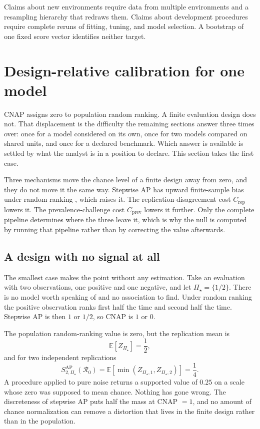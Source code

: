\documentclass[11pt]{article}
\newcommand{\Regime}{\mathcal{R}}
\newcommand{\PSet}{\Pi_\star}
\newcommand{\E}{\mathbb{E}}
\theoremstyle{remark}
\begin{document}
Claims about new environments require data from multiple environments and a resampling hierarchy that redraws them. Claims about development procedures require complete reruns of fitting, tuning, and model selection. A bootstrap of one fixed score vector identifies neither target.

\section{Design-relative calibration for one model}
\label{sec:calibration}

CNAP assigns zero to population random ranking. A finite evaluation design does not. That displacement is the difficulty the remaining sections answer three times over: once for a model considered on its own, once for two models compared on shared units, and once for a declared benchmark. Which answer is available is settled by what the analyst is in a position to declare. This section takes the first case.

Three mechanisms move the chance level of a finite design away from zero, and they do not move it the same way. Stepwise AP has upward finite-sample bias under random ranking \cite{bestgen2015random}, which raises it. The replication-disagreement cost $C_{\mathrm{rep}}$ lowers it. The prevalence-challenge cost $C_{\mathrm{prev}}$ lowers it further. Only the complete pipeline determines where the three leave it, which is why the null is computed by running that pipeline rather than by correcting the value afterwards.

\subsection{A design with no signal at all}

The smallest case makes the point without any estimation. Take an evaluation with two observations, one positive and one negative, and let $\PSet=\{1/2\}$. There is no model worth speaking of and no association to find. Under random ranking the positive observation ranks first half the time and second half the time. Stepwise AP is then $1$ or $1/2$, so CNAP is $1$ or $0$.

The population random-ranking value is zero, but the replication mean is
\[
\E[Z_{\PSet}]
=
\frac12,
\]
and for two independent replications
\[
S_{2,\PSet}^{\mathrm{AP}}(\Regime_0)
=
\E[\min(Z_{\PSet,1},Z_{\PSet,2})]
=
\frac14.
\]
A procedure applied to pure noise returns a supported value of $0.25$ on a scale whose zero was supposed to mean chance. Nothing has gone wrong. The discreteness of stepwise AP puts half the mass at CNAP $=1$, and no amount of chance normalization can remove a distortion that lives in the finite design rather than in the population.
\end{document}
